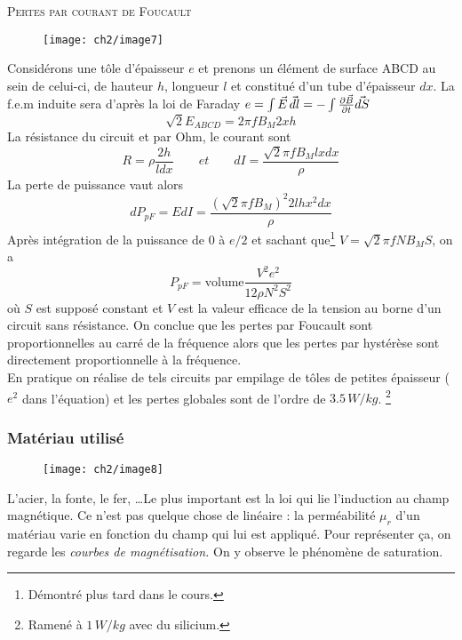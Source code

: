 	\textsc{Pertes par courant de Foucault}\\
	\begin{wrapfigure}[18]{r}{2.5cm}
	\vspace{-5mm}
	\texttt{[image: ch2/image7]} 
	\label{fig:2.7}
	\end{wrapfigure}
	Considérons une tôle d'épaisseur $e$ et prenons un élément de surface ABCD au sein de celui-ci, de hauteur $h$, longueur $l$ et constitué d'un tube d'épaisseur $dx$. La f.e.m induite sera d'après la loi de Faraday $e = \int \vec{E}\, \vec{dl} = -\int \frac{\partial \vec{B}}{\partial  t} \vec{dS}$
	\begin{equation}
		\sqrt{2} E_{ABCD} = 2\pi f B_M 2xh
	\end{equation}	 
	La résistance du circuit et par Ohm, le courant sont 
	\begin{equation}
		R = \rho\frac{2h}{ldx} \qquad et \qquad dI = \frac{\sqrt{2}\pi f B_M lxdx}{\rho}
	\end{equation}
	La perte de puissance vaut alors
	\begin{equation}
		dP_{pF} = EdI = \frac{(\sqrt{2}\pi f B_M)^2  2lhx^2dx}{\rho}
	\end{equation}
	Après intégration de la puissance de 0 à $e/2$	et sachant que\footnote{Démontré plus tard dans le cours.} $V = \sqrt{2}\pi f NB_MS$, on a 
	\begin{equation}
		P_{pF} = \mbox{volume}\frac{V^2e^2}{12\rho N^2 S^2}
	\end{equation}
	où $S$ est supposé constant et $V$ est la valeur efficace de la tension au borne d'un circuit sans résistance. On conclue que les pertes par Foucault sont proportionnelles au carré de la fréquence alors que les pertes par hystérèse sont directement proportionnelle à la fréquence. \\
	En pratique on réalise de tels circuits par empilage de tôles de petites épaisseur ($e^2$ dans l'équation) et les pertes globales sont de l'ordre de $3.5\, W/kg$. \footnote{Ramené à $1\, W/kg$ avec du silicium.}
	
	\subsubsection{Matériau utilisé}
	\begin{wrapfigure}[6]{r}{5cm}
	\vspace{-5mm}
	\texttt{[image: ch2/image8]} 
	\label{fig:2.7}
	\end{wrapfigure}
	L'acier, la fonte, le fer, \dots Le plus important est la loi qui lie l'induction au champ magnétique. Ce n'est 
	pas quelque chose de linéaire : la perméabilité $\mu _r$ d'un matériau varie en 
	fonction du champ qui lui est appliqué. Pour représenter ça, on regarde 
	les \textit{courbes de magnétisation.} On y observe le phénomène de saturation. 
	
